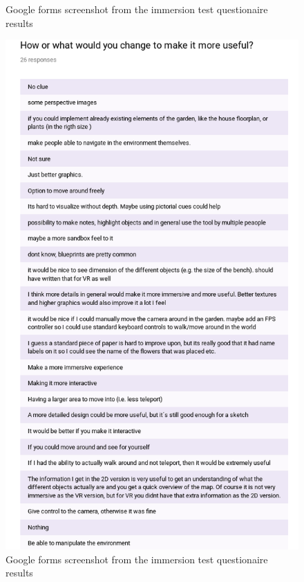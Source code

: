 \begin{multicols}{2}
\begin{figure}[H]
		\caption{Google forms screenshot from the immersion test questionaire results}
	\end{figure}
	\begin{figure}[H]
		\includegraphics[width=1.0\linewidth]{include/Appendices/immersionQuestionnaire/6.png}
		\caption{Google forms screenshot from the immersion test questionaire results}
	\end{figure}
	\begin{figure}[H]

\end{figure}
\end{multicols}
